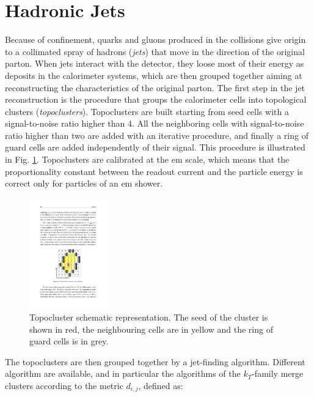 \section{Hadronic Jets}

Because of confinement, quarks and gluons produced in the collisions give origin to a collimated spray of hadrons (\textit{jets}) that move in the direction of the original parton. When jets interact with the detector, they loose most of their energy as deposits in the calorimeter systems, which are then grouped together aiming at reconstructing the characteristics of the original parton. 
The first step in the jet reconstruction is the procedure that groups the calorimeter cells into topological clusters (\textit{topoclusters}). Topoclusters are built starting from seed cells with a signal-to-noise ratio higher than 4. All the neighboring cells with signal-to-noise ratio higher than two are added with an iterative procedure, and finally a ring of guard cells are added independently of their signal. This procedure is illustrated in Fig. \ref{fig:obj:topocluster}. Topoclusters are calibrated at the \gls{em} scale, which means that the proportionality constant between the readout current and the particle energy is correct only for particles of an \gls{em} shower.

\begin{figure}[h]
\begin{center}
\includegraphics[width=0.3\textwidth]{./figures/objects/topocluster.pdf}
\end{center}
\caption[Topocluster schematic representation]{Topocluster schematic representation. The seed of the cluster is shown in red, the neighbouring cells are in yellow and the ring of guard cells is in grey.}
\label{fig:obj:topocluster}
\end{figure}
 

The topoclusters are then grouped together by a jet-finding algorithm. Different algorithm are available, and in particular the algorithms of the $k_T$-family merge clusters according to the metric $d_{i,j}$, defined as:

